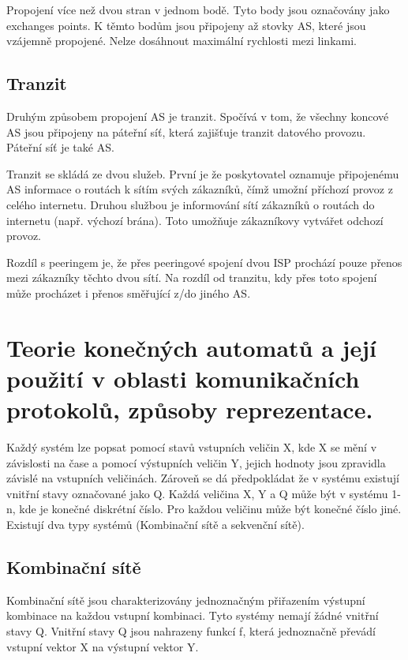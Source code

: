 Propojení více než dvou stran v jednom bodě.
Tyto body jsou označovány jako exchanges points.
K těmto bodům jsou připojeny až stovky AS, které jsou vzájemně propojené.
Nelze dosáhnout maximální rychlosti mezi linkami.

\subsection{Tranzit}

Druhým způsobem propojení AS je tranzit.
Spočívá v tom, že všechny koncové AS jsou připojeny na páteřní síť, která zajišťuje tranzit datového provozu.
Páteřní síť je také AS.

Tranzit se skládá ze dvou služeb.
První je že poskytovatel oznamuje připojenému AS informace o routách k sítím svých zákazníků, čímž umožní příchozí provoz z celého internetu.
Druhou službou je informování sítí zákazníků o routách do internetu (např. výchozí brána).
Toto umožňuje zákazníkovy vytvářet odchozí provoz.

Rozdíl s peeringem je, že přes peeringové spojení dvou ISP prochází pouze přenos mezi zákazníky těchto dvou sítí.
Na rozdíl od tranzitu, kdy přes toto spojení může procházet i přenos směřující z/do jiného AS.


\clearpage
\section{Teorie konečných automatů a její použití v oblasti komunikačních protokolů, způsoby reprezentace.}

Každý systém lze popsat pomocí stavů vstupních veličin X, kde X se mění v závislosti na čase a pomocí výstupních veličin Y, jejich hodnoty jsou zpravidla závislé na vstupních veličinách.
Zároveň se dá předpokládat že v systému existují vnitřní stavy označované jako Q.
Každá veličina X, Y a Q může být v systému 1-n, kde je konečné diskrétní číslo.
Pro každou veličinu může být konečné číslo jiné.
Existují dva typy systémů (Kombinační sítě a sekvenční sítě).

\subsection{Kombinační sítě}

Kombinační sítě jsou charakterizovány jednoznačným přiřazením výstupní kombinace na každou vstupní kombinaci.
Tyto systémy nemají žádné vnitřní stavy Q.
Vnitřní stavy Q jsou nahrazeny funkcí f, která jednoznačně převádí vstupní vektor X na výstupní vektor Y.

